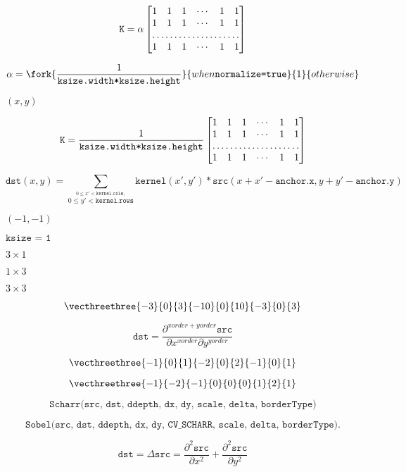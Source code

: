 \documentclass{article}
\begin{document}
\[\texttt{K} = \alpha \begin{bmatrix} 1 & 1 & 1 & \cdots & 1 & 1 \\ 1 & 1 & 1 & \cdots & 1 & 1 \\ \hdotsfor{6} \\ 1 & 1 & 1 & \cdots & 1 & 1 \end{bmatrix}\]
\pagebreak

\[\alpha = \fork{\frac{1}{\texttt{ksize.width*ksize.height}}}{when \texttt{normalize=true}}{1}{otherwise}\]
\pagebreak

$ (x, y) $
\pagebreak

\[\texttt{K} = \frac{1}{\texttt{ksize.width*ksize.height}} \begin{bmatrix} 1 & 1 & 1 & \cdots & 1 & 1 \\ 1 & 1 & 1 & \cdots & 1 & 1 \\ \hdotsfor{6} \\ 1 & 1 & 1 & \cdots & 1 & 1 \\ \end{bmatrix}\]
\pagebreak

\[\texttt{dst} (x,y) = \sum _{ \stackrel{0\leq x' < \texttt{kernel.cols},}{0\leq y' < \texttt{kernel.rows}} } \texttt{kernel} (x',y')* \texttt{src} (x+x'- \texttt{anchor.x} ,y+y'- \texttt{anchor.y} )\]
\pagebreak

$(-1,-1)$
\pagebreak

$\texttt{ksize = 1}$
\pagebreak

$3 \times 1$
\pagebreak

$1 \times 3$
\pagebreak

$3\times3$
\pagebreak

\[\vecthreethree{-3}{0}{3}{-10}{0}{10}{-3}{0}{3}\]
\pagebreak

\[\texttt{dst} = \frac{\partial^{xorder+yorder} \texttt{src}}{\partial x^{xorder} \partial y^{yorder}}\]
\pagebreak

\[\vecthreethree{-1}{0}{1}{-2}{0}{2}{-1}{0}{1}\]
\pagebreak

\[\vecthreethree{-1}{-2}{-1}{0}{0}{0}{1}{2}{1}\]
\pagebreak

\[\texttt{Scharr(src, dst, ddepth, dx, dy, scale, delta, borderType)}\]
\pagebreak

\[\texttt{Sobel(src, dst, ddepth, dx, dy, CV\_SCHARR, scale, delta, borderType)} .\]
\pagebreak

\[\texttt{dst} = \Delta \texttt{src} = \frac{\partial^2 \texttt{src}}{\partial x^2} + \frac{\partial^2 \texttt{src}}{\partial y^2}\]
\pagebreak
\end{document}
